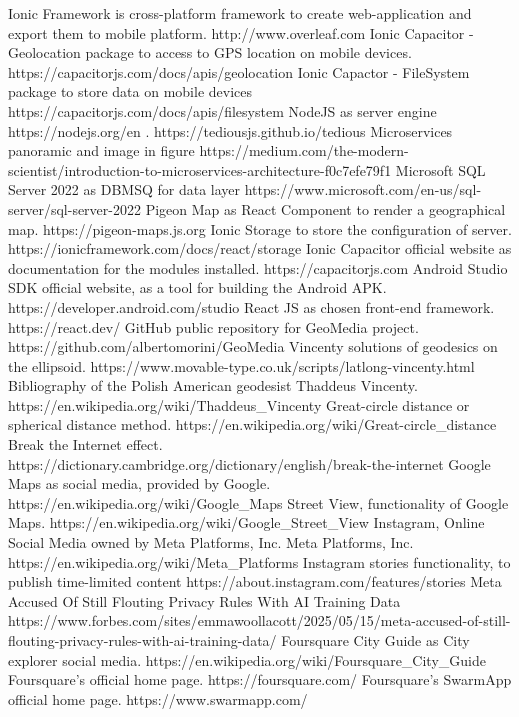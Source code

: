 \documentclass[conference]{IEEEtran}
\begin{document}
\begin{thebibliography}{00}
 Ionic Framework is cross-platform framework to create web-application and export them to mobile platform. http://www.overleaf.com
 Ionic Capacitor - Geolocation package to access to GPS location on mobile devices. https://capacitorjs.com/docs/apis/geolocation
Ionic Capactor - FileSystem package to store data on mobile devices https://capacitorjs.com/docs/apis/filesystem
 NodeJS as server engine https://nodejs.org/en
. https://tediousjs.github.io/tedious
 Microservices panoramic and image in figure https://medium.com/the-modern-scientist/introduction-to-microservices-architecture-f0c7efe79f1
 Microsoft SQL Server 2022 as DBMSQ for data layer https://www.microsoft.com/en-us/sql-server/sql-server-2022
 Pigeon Map as React Component to render a geographical map. https://pigeon-maps.js.org
Ionic Storage to store the configuration of server. https://ionicframework.com/docs/react/storage
Ionic Capacitor official website as documentation for the modules installed. https://capacitorjs.com
Android Studio SDK official website, as a tool for building the Android APK. https://developer.android.com/studio
React JS as chosen front-end framework. https://react.dev/
GitHub public repository for GeoMedia project. https://github.com/albertomorini/GeoMedia
 Vincenty solutions of geodesics on the ellipsoid. 
https://www.movable-type.co.uk/scripts/latlong-vincenty.html
 Bibliography of the Polish American geodesist Thaddeus Vincenty. https://en.wikipedia.org/wiki/Thaddeus\_Vincenty
Great-circle distance or spherical distance method.
https://en.wikipedia.org/wiki/Great-circle\_distance
 Break the Internet effect. https://dictionary.cambridge.org/dictionary/english/break-the-internet
 Google Maps as social media, provided by Google. https://en.wikipedia.org/wiki/Google\_Maps
 Street View, functionality of Google Maps.
https://en.wikipedia.org/wiki/Google_Street_View
 Instagram, Online Social Media owned by Meta Platforms, Inc.
 Meta Platforms, Inc.
https://en.wikipedia.org/wiki/Meta_Platforms
 Instagram stories functionality, to publish time-limited content
https://about.instagram.com/features/stories
Meta Accused Of Still Flouting Privacy Rules With AI Training Data
https://www.forbes.com/sites/emmawoollacott/2025/05/15/meta-accused-of-still-flouting-privacy-rules-with-ai-training-data/
 Foursquare City Guide as City explorer social media.
https://en.wikipedia.org/wiki/Foursquare\_City\_Guide
 Foursquare's official home page.
https://foursquare.com/
 Foursquare's SwarmApp official home page.
https://www.swarmapp.com/
\end{thebibliography}

\vspace{12pt}
\end{document}

